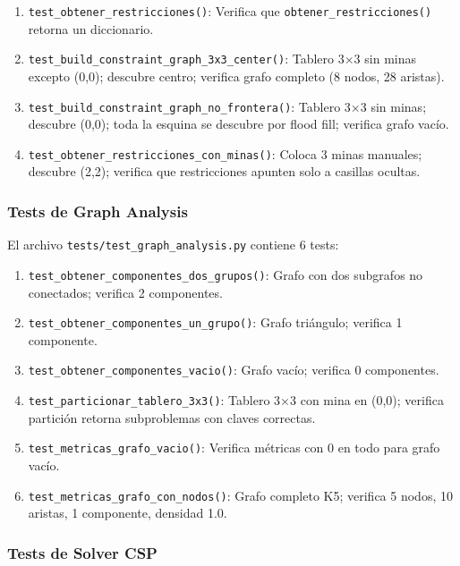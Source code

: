 \documentclass[12pt,a4paper]{article}
\begin{document}
\begin{enumerate}[itemsep=2pt]
    \item \texttt{test\_obtener\_restricciones()}: Verifica que \texttt{obtener\_restricciones()} retorna un diccionario.
    \item \texttt{test\_build\_constraint\_graph\_3x3\_center()}: Tablero 3$\times$3 sin minas excepto (0,0); descubre centro; verifica grafo completo (8 nodos, 28 aristas).
    \item \texttt{test\_build\_constraint\_graph\_no\_frontera()}: Tablero 3$\times$3 sin minas; descubre (0,0); toda la esquina se descubre por flood fill; verifica grafo vacío.
    \item \texttt{test\_obtener\_restricciones\_con\_minas()}: Coloca 3 minas manuales; descubre (2,2); verifica que restricciones apunten solo a casillas ocultas.
\end{enumerate}

\subsubsection{Tests de Graph Analysis}

El archivo \texttt{tests/test\_graph\_analysis.py} contiene 6 tests:

\begin{enumerate}[itemsep=2pt]
    \item \texttt{test\_obtener\_componentes\_dos\_grupos()}: Grafo con dos subgrafos no conectados; verifica 2 componentes.
    \item \texttt{test\_obtener\_componentes\_un\_grupo()}: Grafo triángulo; verifica 1 componente.
    \item \texttt{test\_obtener\_componentes\_vacio()}: Grafo vacío; verifica 0 componentes.
    \item \texttt{test\_particionar\_tablero\_3x3()}: Tablero 3$\times$3 con mina en (0,0); verifica partición retorna subproblemas con claves correctas.
    \item \texttt{test\_metricas\_grafo\_vacio()}: Verifica métricas con 0 en todo para grafo vacío.
    \item \texttt{test\_metricas\_grafo\_con\_nodos()}: Grafo completo K5; verifica 5 nodos, 10 aristas, 1 componente, densidad 1.0.
\end{enumerate}

\subsubsection{Tests de Solver CSP}
\end{document}
